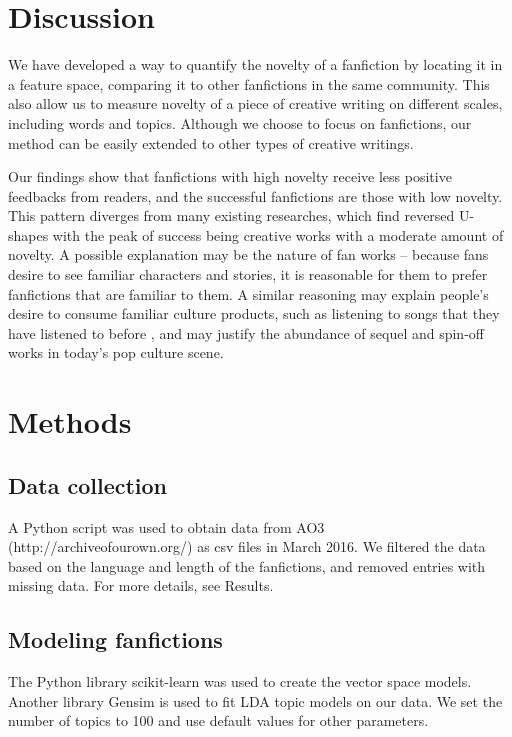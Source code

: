 \documentclass[a4paper]{article}
\begin{document}
\section*{Discussion}
We have developed a way to quantify the novelty of a fanfiction by locating it in a feature space, comparing it to other fanfictions in the same community. This also allow us to measure novelty of a piece of creative writing on different scales, including words and topics. Although we choose to focus on fanfictions, our method can be easily extended to other types of creative writings.

Our findings show that fanfictions with high novelty receive less positive feedbacks from readers, and the successful fanfictions are those with low novelty. This pattern diverges from many existing researches, which find reversed U-shapes with the peak of success being creative works with a moderate amount of novelty. A possible explanation may be the nature of fan works -- because fans desire to see familiar characters and stories, it is reasonable for them to prefer fanfictions that are familiar to them. A similar reasoning may explain people's desire to consume familiar culture products, such as listening to songs that they have listened to before \cite{thompson2014shazam}, and may justify the abundance of sequel and spin-off works in today's pop culture scene. 

\section*{Methods}

\subsection*{Data collection}
A Python script was used to obtain data from AO3 (http://archiveofourown.org/) as csv files in March 2016. We filtered the data based on the language and length of the fanfictions, and removed entries with missing data. For more details, see Results.


\subsection*{Modeling fanfictions}
The Python library scikit-learn was used to create the vector space models. Another library Gensim is used to fit LDA topic models on our data. We set the number of topics to 100 and use default values for other parameters. 







    
\end{document}
